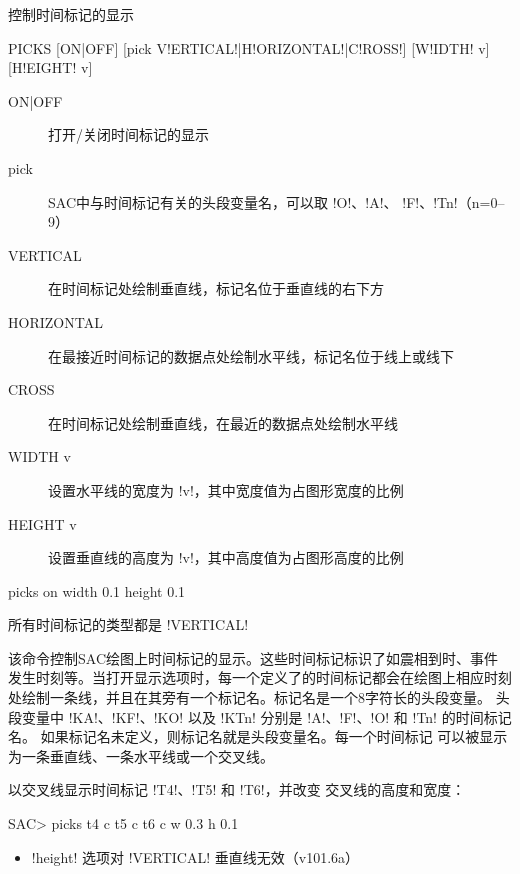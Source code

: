 \label{cmd:picks}

控制时间标记的显示

\begin{SACSTX}
PICKS [ON|OFF] [pick V!ERTICAL!|H!ORIZONTAL!|C!ROSS!] [W!IDTH! v] [H!EIGHT! v]
\end{SACSTX}

\begin{description}
\item [ON|OFF] 打开/关闭时间标记的显示
\item [pick] SAC中与时间标记有关的头段变量名，可以取 !O!、!A!、
    !F!、!Tn!（n=0--9）
\item [VERTICAL] 在时间标记处绘制垂直线，标记名位于垂直线的右下方
\item [HORIZONTAL] 在最接近时间标记的数据点处绘制水平线，标记名位于线上或线下
\item [CROSS] 在时间标记处绘制垂直线，在最近的数据点处绘制水平线
\item [WIDTH v] 设置水平线的宽度为 !v!，其中宽度值为占图形宽度的比例
\item [HEIGHT v] 设置垂直线的高度为 !v!，其中高度值为占图形高度的比例
\end{description}

\begin{SACDFT}
picks on width 0.1 height 0.1
\end{SACDFT}
所有时间标记的类型都是 !VERTICAL!

该命令控制SAC绘图上时间标记的显示。这些时间标记标识了如震相到时、事件
发生时刻等。当打开显示选项时，每一个定义了的时间标记都会在绘图上相应时刻
处绘制一条线，并且在其旁有一个标记名。标记名是一个8字符长的头段变量。
头段变量中 !KA!、!KF!、!KO! 以及 !KTn!
分别是 !A!、!F!、!O! 和 !Tn! 的时间标记名。
如果标记名未定义，则标记名就是头段变量名。每一个时间标记
可以被显示为一条垂直线、一条水平线或一个交叉线。

以交叉线显示时间标记 !T4!、!T5! 和 !T6!，并改变
交叉线的高度和宽度：
\begin{SACCode}
SAC> picks t4 c t5 c t6 c w 0.3 h 0.1
\end{SACCode}

\begin{itemize}
\item !height! 选项对 !VERTICAL! 垂直线无效（v101.6a）
\end{itemize}
